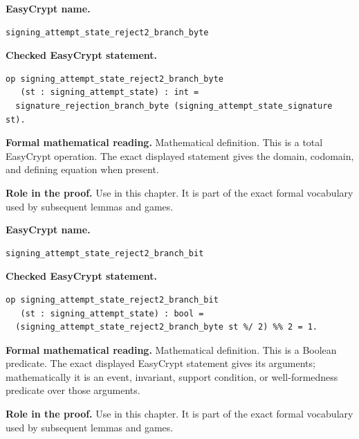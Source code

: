 \begin{formaldefinition}
\noindent\textbf{EasyCrypt name.}
\begin{lstlisting}[language=EasyCrypt,basicstyle=\ttfamily\scriptsize]
signing_attempt_state_reject2_branch_byte
\end{lstlisting}
\noindent\textbf{Checked EasyCrypt statement.}
\begin{lstlisting}[language=EasyCrypt,basicstyle=\ttfamily\scriptsize]
op signing_attempt_state_reject2_branch_byte
   (st : signing_attempt_state) : int =
  signature_rejection_branch_byte (signing_attempt_state_signature st).
\end{lstlisting}
\noindent\textbf{Formal mathematical reading.}
Mathematical definition. This is a total EasyCrypt operation.  The exact displayed statement gives the domain, codomain, and defining equation when present.

\noindent\textbf{Role in the proof.}
Use in this chapter. It is part of the exact formal vocabulary used by subsequent lemmas and games.

\end{formaldefinition}

\begin{formaldefinition}
\noindent\textbf{EasyCrypt name.}
\begin{lstlisting}[language=EasyCrypt,basicstyle=\ttfamily\scriptsize]
signing_attempt_state_reject2_branch_bit
\end{lstlisting}
\noindent\textbf{Checked EasyCrypt statement.}
\begin{lstlisting}[language=EasyCrypt,basicstyle=\ttfamily\scriptsize]
op signing_attempt_state_reject2_branch_bit
   (st : signing_attempt_state) : bool =
  (signing_attempt_state_reject2_branch_byte st %/ 2) %% 2 = 1.
\end{lstlisting}
\noindent\textbf{Formal mathematical reading.}
Mathematical definition. This is a Boolean predicate.  The exact displayed EasyCrypt statement gives its arguments; mathematically it is an event, invariant, support condition, or well-formedness predicate over those arguments.

\noindent\textbf{Role in the proof.}
Use in this chapter. It is part of the exact formal vocabulary used by subsequent lemmas and games.

\end{formaldefinition}

